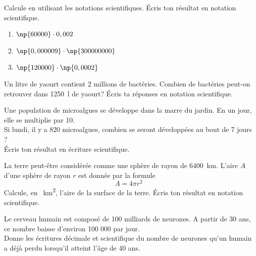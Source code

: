\documentclass[../math2.tex]{subfiles}
\begin{document}
\begin{exercise}
	Calcule en utilisant les notations scientifiques. Écris ton résultat en notation scientifique.
	\begin{enumerate}[cols=3]
		\item  $\np{60000}\cdot 0,002$
		\item  $\np{0,000009}\cdot \np{300000000}$
		\item  $\np{120000}\cdot \np{0,0002}$
	\end{enumerate}
\end{exercise}

\begin{exercise}
	Un litre de yaourt contient 2 millions de bactéries. Combien de bactéries peut-on retrouver dans \SI{1250}{l} de yaourt? Écris ta réponses en notation scientifique.

\end{exercise}

\begin{exercise}
	Une population de microalgues se développe dans la marre du jardin. En un jour, elle se multiplie par 10.\\
	Si lundi, il y a 820 microalgues, combien se seront développées au bout de 7 jours ? \\
	Écris ton résultat en écriture scientifique.
\end{exercise}

\begin{exercise}
	La terre peut-être considérée comme une sphère de rayon de \SI{6400}{km}. L'aire $A$ d'une sphère de rayon $r$ est donnée par la formule
	\begin{equation*}
		A=4\pi r^2
	\end{equation*}
	Calcule, en \SI{}{km^2}, l'aire de la surface de la terre. Écris ton résultat en notation scientifique.


\end{exercise}

\begin{exercise}
	Le cerveau humain est composé de 100 milliards de neurones. A partir de 30 ans, ce nombre baisse d'environ 100 000 par jour. \\
	Donne les écritures décimale et scientifique du nombre de neurones qu'un humain a déjà perdu lorsqu'il atteint l'âge de 40 ans.

\end{exercise}
\end{document}
